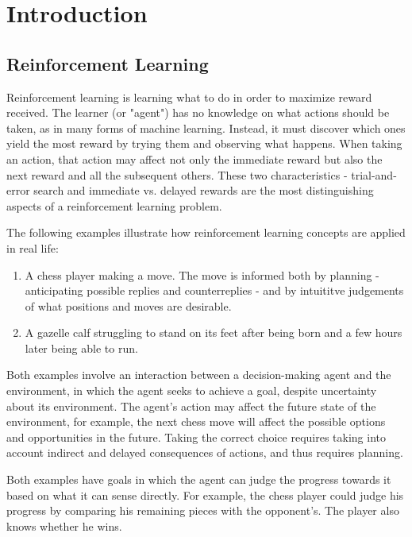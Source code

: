 
\chapter{Introduction}

\section{Reinforcement Learning}
Reinforcement learning is learning what to do in order to maximize reward received. The learner (or "agent") has no knowledge on what actions should be taken, as in many forms of machine learning. Instead, it must discover which ones yield the most reward by trying them and observing what happens. When taking an action, that action may affect not only the immediate reward but also the next reward and all the subsequent others. These two characteristics - trial-and-error search and immediate vs. delayed rewards are the most distinguishing aspects of a reinforcement learning problem. 

The following examples illustrate how reinforcement learning concepts are applied in real life:
\begin{enumerate}
    \item A chess player making a move. The move is informed both by planning - anticipating possible replies and counterreplies - and by intuititve judgements of what positions and moves are desirable.
    \item A gazelle calf struggling to stand on its feet after being born and a few hours later being able to run.
\end{enumerate}

Both examples involve an interaction between a decision-making agent and the environment, in which the agent seeks to achieve a goal, despite uncertainty about its environment. The agent's action may affect the future state of the environment, for example, the next chess move will affect the possible options and opportunities in the future. Taking the correct choice requires taking into account indirect and delayed consequences of actions, and thus requires planning.

Both examples have goals in which the agent can judge the progress towards it based on what it can sense directly. For example, the chess player could judge his progress by comparing his remaining pieces with the opponent's. The player also knows whether he wins.

